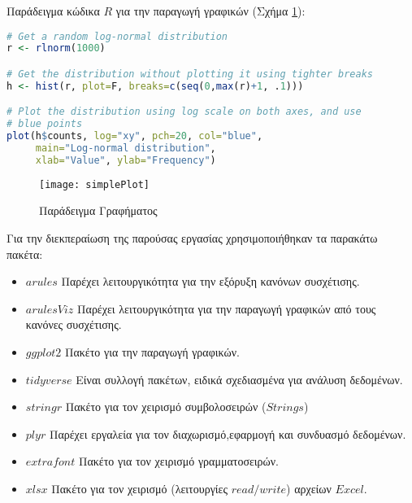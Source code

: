 \documentclass[12pt,a4paper,final]{article}
\begin{document}
Παράδειγμα κώδικα $R$ για την παραγωγή γραφικών (Σχήμα \ref{fig:simple_plot}):
\begin{lstlisting}[language=R]
# Get a random log-normal distribution
r <- rlnorm(1000)

# Get the distribution without plotting it using tighter breaks
h <- hist(r, plot=F, breaks=c(seq(0,max(r)+1, .1)))

# Plot the distribution using log scale on both axes, and use
# blue points
plot(h$counts, log="xy", pch=20, col="blue",
     main="Log-normal distribution",
     xlab="Value", ylab="Frequency")
\end{lstlisting}

\graphicspath{{./figures/}}
\begin{figure}[h]
         \centering
         \texttt{[image: simplePlot]}
         \caption{Παράδειγμα Γραφήματος}
         \label{fig:simple_plot}
\end{figure}

\clearpage
Για την διεκπεραίωση της παρούσας εργασίας χρησιμοποιήθηκαν τα παρακάτω πακέτα:
\begin{itemize}
	\item $arules$ \cite{arules} Παρέχει λειτουργικότητα για την εξόρυξη κανόνων συσχέτισης. 
	\item $arulesViz$ \foreignlanguage{english}{\cite{arulesViz}} Παρέχει λειτουργικότητα για την παραγωγή γραφικών από τους κανόνες συσχέτισης. 
	\item $ggplot2$ \foreignlanguage{english}{\cite{ggplot2}}  Πακέτο για την παραγωγή γραφικών.
	\item $tidyverse$ \foreignlanguage{english}{\cite{tidyverse}} Είναι συλλογή πακέτων, ειδικά σχεδιασμένα για ανάλυση δεδομένων.
	\item $stringr$ \foreignlanguage{english}{\cite{stringr}} Πακέτο για τον χειρισμό συμβολοσειρών ($Strings$)
	\item $plyr$ \foreignlanguage{english}{\cite{plyr}} Παρέχει εργαλεία για τον διαχωρισμό,εφαρμογή και συνδυασμό δεδομένων.
	\item $extrafont$ \foreignlanguage{english}{\cite{extrafont}} Πακέτο για τον χειρισμό γραμματοσειρών.
	\item $xlsx$ \foreignlanguage{english}{\cite{xlsx}} Πακέτο για τον χειρισμό (λειτουργίες $read/write$) αρχείων $Excel$.
\end{itemize}  
\end{document}
